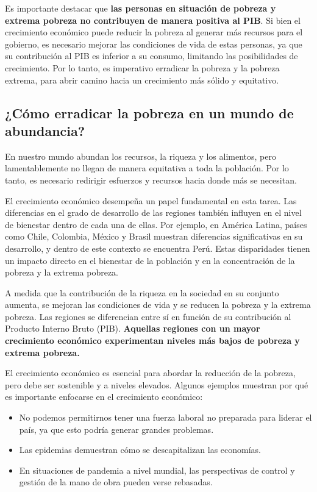\documentclass[
  jou,
  floatsintext,
  longtable,
  a4paper,
  nolmodern,
  notxfonts,
  notimes,
  12pt,
  colorlinks=true,linkcolor=blue,citecolor=blue,urlcolor=blue]{apa7}
\providecommand{\tightlist}{%
  \setlength{\itemsep}{0pt}\setlength{\parskip}{0pt}}
\begin{document}
Es importante destacar que \textbf{las personas en situación de pobreza
y extrema pobreza no contribuyen de manera positiva al PIB}. Si bien el
crecimiento económico puede reducir la pobreza al generar más recursos
para el gobierno, es necesario mejorar las condiciones de vida de estas
personas, ya que su contribución al PIB es inferior a su consumo,
limitando las posibilidades de crecimiento. Por lo tanto, es imperativo
erradicar la pobreza y la pobreza extrema, para abrir camino hacia un
crecimiento más sólido y equitativo.

\subsection{¿Cómo erradicar la pobreza en un mundo de
abundancia?}\label{cuxf3mo-erradicar-la-pobreza-en-un-mundo-de-abundancia}

En nuestro mundo abundan los recursos, la riqueza y los alimentos, pero
lamentablemente no llegan de manera equitativa a toda la población. Por
lo tanto, es necesario redirigir esfuerzos y recursos hacia donde más se
necesitan.

El crecimiento económico desempeña un papel fundamental en esta tarea.
Las diferencias en el grado de desarrollo de las regiones también
influyen en el nivel de bienestar dentro de cada una de ellas. Por
ejemplo, en América Latina, países como Chile, Colombia, México y Brasil
muestran diferencias significativas en su desarrollo, y dentro de este
contexto se encuentra Perú. Estas disparidades tienen un impacto directo
en el bienestar de la población y en la concentración de la pobreza y la
extrema pobreza.

A medida que la contribución de la riqueza en la sociedad en su conjunto
aumenta, se mejoran las condiciones de vida y se reducen la pobreza y la
extrema pobreza. Las regiones se diferencian entre sí en función de su
contribución al Producto Interno Bruto (PIB). \textbf{Aquellas regiones
con un mayor crecimiento económico experimentan niveles más bajos de
pobreza y extrema pobreza.}

El crecimiento económico es esencial para abordar la reducción de la
pobreza, pero debe ser sostenible y a niveles elevados. Algunos ejemplos
muestran por qué es importante enfocarse en el crecimiento económico:

\begin{itemize}
\tightlist
\item
  No podemos permitirnos tener una fuerza laboral no preparada para
  liderar el país, ya que esto podría generar grandes problemas.
\item
  Las epidemias demuestran cómo se descapitalizan las economías.
\item
  En situaciones de pandemia a nivel mundial, las perspectivas de
  control y gestión de la mano de obra pueden verse rebasadas.
\end{itemize}
\end{document}

